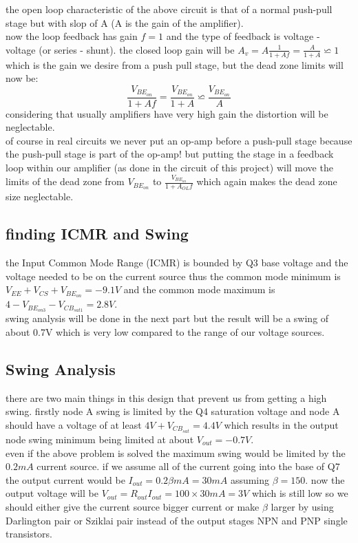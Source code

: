 \documentclass[11pt]{article}
\begin{document}
the open loop characteristic of the above circuit is that of a normal push-pull stage but with
slop of A (A is the gain of the amplifier). \\
now the loop feedback has gain $f = 1$ and the type of feedback is voltage - voltage (or series - shunt).
the closed loop gain will be $ A_v = A\frac{1}{1+Af} = \frac{A}{1+A} \backsimeq 1 $ which is the gain
we desire from a push pull stage, but the dead zone limits will now be: \\
$$ \frac{V_{BE_{on}}}{1+Af} = \frac{V_{BE_{on}}}{1+A} \backsimeq \frac{V_{BE_{on}}}{A} $$
considering that usually amplifiers have very high gain the distortion will be neglectable. \\
of course in real circuits we never put an op-amp before a push-pull stage because the push-pull
stage is part of the op-amp! but putting the stage in a feedback loop within our amplifier (as done in the
circuit of this project) will move the limits of the dead zone from $V_{BE_{on}}$ to $\frac{V_{BE_{on}}}{1+A_{OL}f}$
which again makes the dead zone size neglectable. \\

\subsection{finding ICMR and Swing}
the Input Common Mode Range (ICMR) is bounded by Q3 base voltage and the voltage needed
to be on the current source thus the common mode minimum is $ V_{EE} + V_{CS} + V_{BE_{on}}  = -9.1V $ 
and the common mode maximum is $ 4 - V_{BE_{on3}} - V_{CB_{sat1}} = 2.8V $. \\
swing analysis will be done in the next part but the result will be a swing of about
0.7V which is very low compared to the range of our voltage sources. \\

\subsection{Swing Analysis}
there are two main things in this design that prevent us from getting a high swing.
firstly node A swing is limited by the Q4 saturation voltage and node A should have 
a voltage of at least $ 4V + V_{CB_{sat}} = 4.4V $ which results in the output node swing minimum
being limited at about $ V_{out} = -0.7V $. \\
even if the above problem is solved the maximum swing would be limited by the $0.2mA$ current source.
if we assume all of the current going into the base of Q7 the output current would
be $ I_{out} = 0.2\beta mA = 30mA $ assuming $\beta = 150$. now the output voltage will
be $ V_{out} = R_{out}I_{out} = 100 \times 30mA = 3V $ which is still low
so we should either give the current source bigger current or make $\beta$ larger 
by using Darlington pair or Sziklai pair instead of the output stages NPN and PNP single transistors. \\
\end{document}
